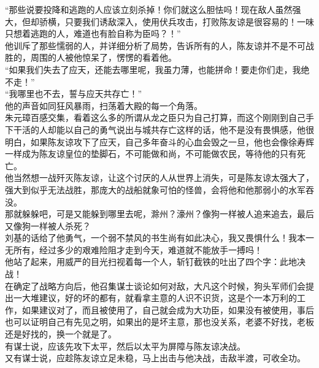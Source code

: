 \begin{multicols}{\theparacolNo}
“那些说要投降和逃跑的人应该立刻杀掉！你们就这么胆怯吗！现在敌人虽然强大，但却骄横，只要我们诱敌深入，使用伏兵攻击，打败陈友谅是很容易的！一味只想着逃跑的人，难道也有脸自称为臣吗？！”\\

他训斥了那些懦弱的人，并详细分析了局势，告诉所有的人，陈友谅并不是不可战胜的，周围的人被他惊呆了，愣愣的看着他。\\

“如果我们失去了应天，还能去哪里呢，我虽力薄，也能拼命！要走你们走，我绝不走！”\\

“我哪里也不去，誓与应天共存亡！”\\

他的声音如同狂风暴雨，扫荡着大殿的每一个角落。\\

朱元璋百感交集，看着这么多的所谓从龙之臣只为自己打算，而这个刚刚到自己手下干活的人却能以自己的勇气说出与城共存亡这样的话，他不是没有畏惧感，他很明白，如果陈友谅攻下了应天，自己多年奋斗的心血会毁之一旦，他也会像徐寿辉一样成为陈友谅皇位的垫脚石，不可能做和尚，不可能做农民，等待他的只有死亡。\\

他当然想一战歼灭陈友谅，让这个讨厌的人从世界上消失，可是陈友谅太强大了，强大到似乎无法战胜，那庞大的战船就象可怕的怪兽，会将他和他那弱小的水军吞没。\\

那就躲躲吧，可是又能躲到哪里去呢，滁州？濠州？像狗一样被人追来追去，最后又像狗一样被人杀死？\\

刘基的话给了他勇气，一个弱不禁风的书生尚有如此决心，我又畏惧什么！我本一无所有，经过多少的艰难险阻才走到今天，难道就不能放手一搏吗！\\

他站了起来，用威严的目光扫视着每一个人，斩钉截铁的吐出了四个字：此地决战！\\

在确定了战略方向后，他召集谋士谈论如何对敌，大凡这个时候，狗头军师们会提出一大堆建议，好的坏的都有，就看拿主意的人识不识货，这是个一本万利的工作，如果建议对了，而且被使用了，自己就会成为大功臣，如果没有被使用，事后也可以证明自己有先见之明，如果出的是坏主意，那也没关系，老婆不好找，老板还是好找的，换一个就是了。\\

有谋士说，应该先攻下太平，然后以太平为屏障与陈友谅决战。\\

又有谋士说，应趁陈友谅立足未稳，马上出击与他决战，击敌半渡，可收全功。\\


\end{multicols}

